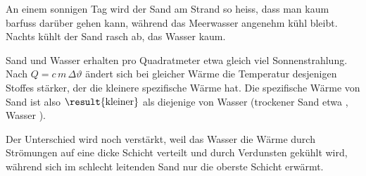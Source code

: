 An einem sonnigen Tag wird der Sand am Strand so heiss, dass man kaum barfuss darüber gehen kann, während das Meerwasser angenehm kühl bleibt. Nachts kühlt der Sand rasch ab, das Wasser kaum.

Sand und Wasser erhalten pro Quadratmeter etwa gleich viel Sonnenstrahlung. Nach $Q = c\,m\,\Delta\vartheta$ ändert sich bei gleicher Wärme die Temperatur desjenigen Stoffes stärker, der die kleinere spezifische Wärme hat. Die spezifische Wärme von Sand ist also $\result{\text{kleiner}}$ als diejenige von Wasser (trockener Sand etwa \cSaO, Wasser \cWO).

Der Unterschied wird noch verstärkt, weil das Wasser die Wärme durch Strömungen auf eine dicke Schicht verteilt und durch Verdunsten gekühlt wird, während sich im schlecht leitenden Sand nur die oberste Schicht erwärmt.
